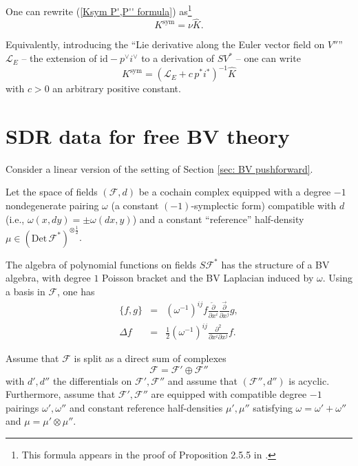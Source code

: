 \documentclass{amsart}
\theoremstyle{plain} %
\theoremstyle{definition}
\theoremstyle{remark}
\newcommand{\mr}{\mathrm}
\newcommand{\wh}{\widehat}
\newcommand{\F}{\mathcal{F}}
\newcommand{\LL}{\mathcal{L}}
\begin{document}
One can rewrite (\ref{Ksym P',P'' formula}) as\footnote{
This formula appears in the proof of Proposition 2.5.5 in \cite{Gwilliam}.} 
\begin{equation}\label{Ksym=nu whK}
    K^\mr{sym}=\nu \wh{K}.
\end{equation}

Equivalently, introducing the ``Lie derivative along the Euler vector field on $V''$'' $\LL_E$ -- the extension of $\mr{id}-p^\vee i^\vee$ to a derivation of $SV^*$ -- one can write
\begin{equation}\label{Ksym L_E formula}
    K^\mr{sym}=(\LL_E+c\, p^* i^*)^{-1} \wh{K}
\end{equation}
with $c>0$ an arbitrary positive constant.






\section{SDR data for free BV theory}
\label{sec: SDR data for free BV theory}
Consider a linear version of the setting of Section \ref{sec: BV pushforward}.

Let the space of fields $(\F,d)$ be a cochain complex equipped with a degree $-1$ nondegenerate pairing $\omega$ (a constant $(-1)$-symplectic form) compatible with $d$ (i.e., $\omega(x,dy)=\pm \omega(dx,y)$) and a constant ``reference'' half-density $\mu \in (\mr{Det}\, \F^*)^{\otimes \frac12}$.

The algebra of polynomial functions on fields $S \F^*$ has the structure of a BV algebra, with degree $1$ Poisson bracket and the BV Laplacian induced by $\omega$. Using a basis in $\F$, one has
\begin{eqnarray}
\{f,g\}&=&(\omega^{-1})^{ij}f\frac{\overleftarrow\partial}{\partial x^i}\frac{\overrightarrow\partial}{\partial x^j} g, \label{Poisson bracket in coords}\\ 
\Delta f&=&\frac12(\omega^{-1})^{ij}\frac{\partial^2}{\partial x^i \partial x^j} f. \label{Delta in coords}
\end{eqnarray}

Assume that $\F$ is split as a direct sum of complexes
\begin{equation}\label{F=F' oplus F''}
    \F=\F'\oplus \F''
\end{equation}
with $d',d''$ the differentials on $\F',\F''$ and assume that $(\F'',d'')$ is acyclic. Furthermore, assume that $\F',\F''$ are equipped with compatible degree $-1$ pairings $\omega',\omega''$ and constant reference half-densities $\mu',\mu''$ satisfying
$\omega=\omega'+\omega''$ and $\mu=\mu'\otimes \mu''$. 
\end{document}
